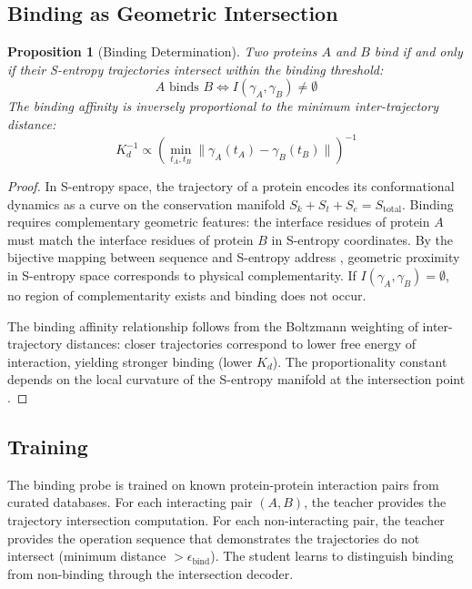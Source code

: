 \documentclass[11pt,twocolumn,a4paper]{article}
\newtheorem{proposition}[theorem]{Proposition}
\theoremstyle{definition}
\theoremstyle{remark}
\newcommand{\Sk}{S_k}
\newcommand{\St}{S_t}
\newcommand{\Se}{S_e}
\begin{document}
\subsection{Binding as Geometric Intersection}

\begin{proposition}[Binding Determination]
\label{prop:binding}
Two proteins $A$ and $B$ bind if and only if their S-entropy trajectories intersect within the binding threshold:
\begin{equation}
A \text{ binds } B \iff I(\gamma_A, \gamma_B) \neq \emptyset
\end{equation}
The binding affinity is inversely proportional to the minimum inter-trajectory distance:
\begin{equation}
K_d^{-1} \propto \left(\min_{t_A, t_B} \|\gamma_A(t_A) - \gamma_B(t_B)\|\right)^{-1}
\end{equation}
\end{proposition}

\begin{proof}
In S-entropy space, the trajectory of a protein encodes its conformational dynamics as a curve on the conservation manifold $\Sk + \St + \Se = S_{\mathrm{total}}$. Binding requires complementary geometric features: the interface residues of protein $A$ must match the interface residues of protein $B$ in S-entropy coordinates. By the bijective mapping between sequence and S-entropy address \citep{sachikonye2025f}, geometric proximity in S-entropy space corresponds to physical complementarity. If $I(\gamma_A, \gamma_B) = \emptyset$, no region of complementarity exists and binding does not occur.

The binding affinity relationship follows from the Boltzmann weighting of inter-trajectory distances: closer trajectories correspond to lower free energy of interaction, yielding stronger binding (lower $K_d$). The proportionality constant depends on the local curvature of the S-entropy manifold at the intersection point \citep{nooren2003}.
\end{proof}

\subsection{Training}

The binding probe is trained on known protein-protein interaction pairs from curated databases. For each interacting pair $(A, B)$, the teacher provides the trajectory intersection computation. For each non-interacting pair, the teacher provides the operation sequence that demonstrates the trajectories do not intersect (minimum distance $> \epsilon_{\text{bind}}$). The student learns to distinguish binding from non-binding through the intersection decoder.
\end{document}
